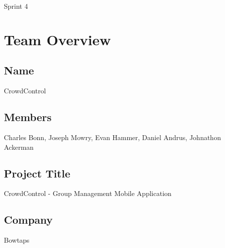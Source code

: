 \documentclass[11pt]{article}
\begin{document}
{\fontsize{16}{16}\selectfont Sprint 4}

\section*{Team Overview}

\subsection*{Name}
CrowdControl
\subsection*{Members}
Charles Bonn, Joseph Mowry, Evan Hammer, Daniel Andrus, Johnathon Ackerman
\subsection*{Project Title}
CrowdControl - Group Management Mobile Application
\subsection*{Company}
Bowtaps
\end{document}
